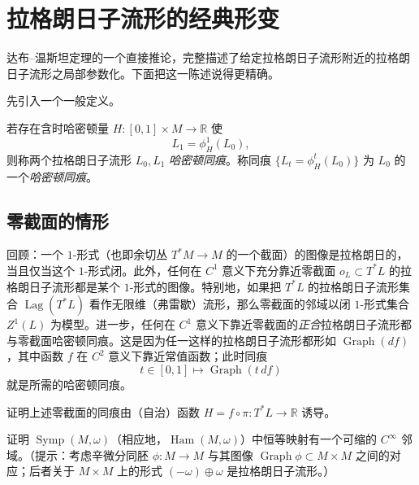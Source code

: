 \section{拉格朗日子流形的经典形变}
\label{sec:classical-lagrangian-deformations}

达布--温斯坦定理的一个直接推论，完整描述了给定拉格朗日子流形附近的拉格朗日子流形之局部参数化。下面把这一陈述说得更精确。

先引入一个一般定义。

\begin{definition}\label{def:hamiltonian-isotopic-lagrangians}
若存在含时哈密顿量 $H:[0,1]\times M\to\mathbb R$ 使
\[
 L_1=\phi_H^1(L_0),
\]
则称两个拉格朗日子流形 $L_0,L_1$ \emph{哈密顿同痕}。称同痕
$\{L_t=\phi_H^t(L_0)\}$ 为 $L_0$ 的一个\emph{哈密顿同痕}。
\end{definition}

\subsection{零截面的情形}
\label{subsec:deformations-zero-section}

回顾：一个 $1$-形式（也即余切丛 $T^*M\to M$ 的一个截面）的图像是拉格朗日的，当且仅当这个 $1$-形式闭。此外，任何在 $C^1$ 意义下充分靠近零截面
$o_L\subset T^*L$ 的拉格朗日子流形都是某个 $1$-形式的图像。特别地，如果把 $T^*L$ 的拉格朗日子流形集合
$\operatorname{Lag}(T^*L)$ 看作无限维（弗雷歇）流形，那么零截面的邻域以闭 $1$-形式集合 $Z^1(L)$ 为模型。进一步，任何在 $C^1$ 意义下靠近零截面的\emph{正合}拉格朗日子流形都与零截面哈密顿同痕。这是因为任一这样的拉格朗日子流形都形如
$\operatorname{Graph}(df)$，其中函数 $f$ 在 $C^2$ 意义下靠近常值函数；此时同痕
\[
 t\in[0,1]\longmapsto\operatorname{Graph}(t\,df)
\]
就是所需的哈密顿同痕。

\begin{exercise}\label{ex:zero-section-graph-hamiltonian}
证明上述零截面的同痕由（自治）函数
$H=f\circ\pi:T^*L\to\mathbb R$ 诱导。
\end{exercise}

\begin{exercise}\label{ex:contractible-neighborhood-symp-ham}
证明 $\operatorname{Symp}(M,\omega)$（相应地，$\operatorname{Ham}(M,\omega)$）中恒等映射有一个可缩的 $C^\infty$ 邻域。（提示：考虑辛微分同胚
$\phi:M\to M$ 与其图像
$\operatorname{Graph}\phi\subset M\times M$ 之间的对应；后者关于 $M\times M$ 上的形式
$(-\omega)\oplus\omega$ 是拉格朗日子流形。）
\end{exercise}

